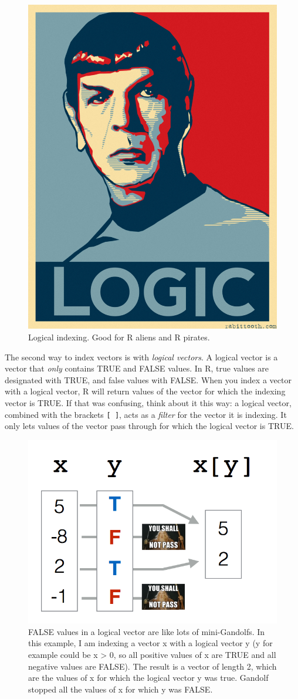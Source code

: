 \documentclass[]{book}
\theoremstyle{definition}
\theoremstyle{definition}
\theoremstyle{remark}
\begin{document}
\begin{figure}

{\centering \includegraphics[width=0.5\linewidth]{images/logic} 

}

\caption{Logical indexing. Good for R aliens and R pirates.}\label{fig:unnamed-chunk-151}
\end{figure}

The second way to index vectors is with \emph{logical vectors}. A
logical vector is a vector that \emph{only} contains TRUE and FALSE
values. In R, true values are designated with TRUE, and false values
with FALSE. When you index a vector with a logical vector, R will return
values of the vector for which the indexing vector is TRUE. If that was
confusing, think about it this way: a logical vector, combined with the
brackets \texttt{{[}\ {]}}, acts as a \emph{filter} for the vector it is
indexing. It only lets values of the vector pass through for which the
logical vector is TRUE.

\begin{figure}

{\centering \includegraphics[width=0.5\linewidth]{images/indexgandolf} 

}

\caption{FALSE values in a logical vector are like lots of mini-Gandolfs. In this example, I am indexing a vector x with a logical vector y (y for example could be x > 0, so all positive values of x are TRUE and all negative values are FALSE). The result is a vector of length 2, which are the values of x for which the logical vector y was true. Gandolf stopped all the values of x for which y was FALSE.}\label{fig:unnamed-chunk-152}
\end{figure}
\end{document}

